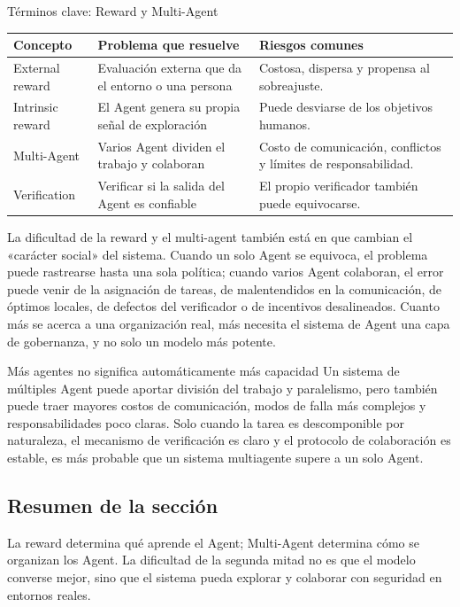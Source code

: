 \documentclass[a4paper]{article}
\begin{document}
\begin{knowledgebox}{Términos clave: Reward y Multi-Agent}
\begin{tabularx}{\textwidth}{p{}p{}X}
\toprule
Concepto & Problema que resuelve & Riesgos comunes \\
\midrule
External reward & Evaluación externa que da el entorno o una persona & Costosa, dispersa y propensa al sobreajuste. \\
Intrinsic reward & El Agent genera su propia señal de exploración & Puede desviarse de los objetivos humanos. \\
Multi-Agent & Varios Agent dividen el trabajo y colaboran & Costo de comunicación, conflictos y límites de responsabilidad. \\
Verification & Verificar si la salida del Agent es confiable & El propio verificador también puede equivocarse. \\
\bottomrule
\end{tabularx}
\end{knowledgebox}

La dificultad de la reward y el multi-agent también está en que cambian el «carácter social» del sistema. Cuando un solo Agent se equivoca, el problema puede rastrearse hasta una sola política; cuando varios Agent colaboran, el error puede venir de la asignación de tareas, de malentendidos en la comunicación, de óptimos locales, de defectos del verificador o de incentivos desalineados. Cuanto más se acerca a una organización real, más necesita el sistema de Agent una capa de gobernanza, y no solo un modelo más potente.

\begin{warningbox}{Más agentes no significa automáticamente más capacidad}
Un sistema de múltiples Agent puede aportar división del trabajo y paralelismo, pero también puede traer mayores costos de comunicación, modos de falla más complejos y responsabilidades poco claras. Solo cuando la tarea es descomponible por naturaleza, el mecanismo de verificación es claro y el protocolo de colaboración es estable, es más probable que un sistema multiagente supere a un solo Agent.
\end{warningbox}

\subsection{Resumen de la sección}

La reward determina qué aprende el Agent; Multi-Agent determina cómo se organizan los Agent. La dificultad de la segunda mitad no es que el modelo converse mejor, sino que el sistema pueda explorar y colaborar con seguridad en entornos reales.
\end{document}
